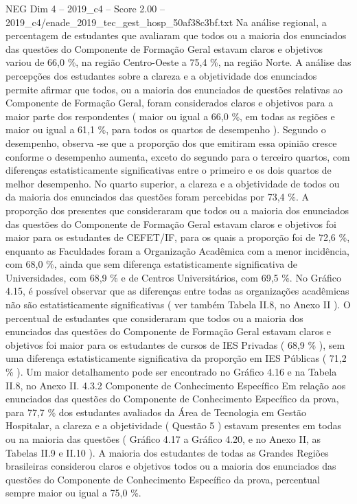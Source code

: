 \begin{textsample}{NEG Dim 4 – 2019\_c4 – Score 2.00 – 2019\_c4/enade\_2019\_tec\_gest\_hosp\_50af38c3bf.txt}
Na análise regional, a percentagem de estudantes que avaliaram que todos ou a maioria dos enunciados das questões do Componente de Formação Geral estavam claros e objetivos variou de 66,0 \%, na região Centro-Oeste a 75,4 \%, na região Norte.
A análise das percepções dos estudantes sobre a clareza e a objetividade dos enunciados permite afirmar que todos, ou a maioria dos enunciados de questões relativas ao Componente de Formação Geral, foram considerados claros e objetivos para a maior parte dos respondentes ( maior ou igual a 66,0 \%, em todas as regiões e maior ou igual a 61,1 \%, para todos os quartos de desempenho ).
Segundo o desempenho, observa -se que a proporção dos que emitiram essa opinião cresce conforme o desempenho aumenta, exceto do segundo para o terceiro quartos, com diferenças estatisticamente significativas entre o primeiro e os dois quartos de melhor desempenho.
No quarto superior, a clareza e a objetividade de todos ou da maioria dos enunciados das questões foram percebidas por 73,4 \%.
A proporção dos presentes que consideraram que todos ou a maioria dos enunciados das questões do Componente de Formação Geral estavam claros e objetivos foi maior para os estudantes de CEFET/IF, para os quais a proporção foi de 72,6 \%, enquanto as Faculdades foram a Organização Acadêmica com a menor incidência, com 68,0 \%, ainda que sem diferença estatisticamente significativa de Universidades, com 68,9 \% e de Centros Universitários, com 69,5 \%.
No Gráfico 4.15, é possível observar que as diferenças entre todas as organizações acadêmicas não são estatisticamente significativas ( ver também Tabela II.8, no Anexo II ).
O percentual de estudantes que consideraram que todos ou a maioria dos enunciados das questões do Componente de Formação Geral estavam claros e objetivos foi maior para os estudantes de cursos de IES Privadas ( 68,9 \% ), sem uma diferença estatisticamente significativa da proporção em IES Públicas ( 71,2 \% ).
Um maior detalhamento pode ser encontrado no Gráfico 4.16 e na Tabela II.8, no Anexo II. 4.3.2 Componente de Conhecimento Específico Em relação aos enunciados das questões do Componente de Conhecimento Específico da prova, para 77,7 \% dos estudantes avaliados da Área de Tecnologia em Gestão Hospitalar, a clareza e a objetividade ( Questão 5 ) estavam presentes em todas ou na maioria das questões ( Gráfico 4.17 a Gráfico 4.20, e no Anexo II, as Tabelas II.9 e II.10 ).
A maioria dos estudantes de todas as Grandes Regiões brasileiras considerou claros e objetivos todos ou a maioria dos enunciados das questões do Componente de Conhecimento Específico da prova, percentual sempre maior ou igual a 75,0 \%.

\end{textsample}
